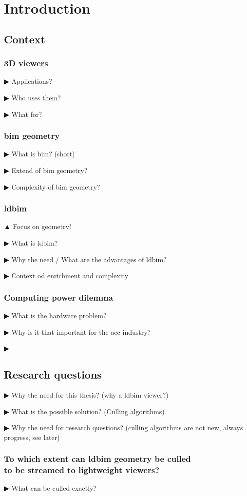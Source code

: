 \chapter{Introduction}
\section{Context}
\subsection{3D viewers}
▶ Applications?

▶ Who uses them?

▶ What for?

\subsection{\acs{bim} geometry}
▶ What is \ac{bim}? (short)

▶ Extend of \ac{bim} geometry?

▶ Complexity of \ac{bim} geometry?

\subsection{\acs{ldbim}}
▲ Focus on geometry!

▶ What is \ac{ldbim}?

▶ Why the need / What are the advantages of \ac{ldbim}?

▶ Context od enrichment and complexity

\subsection{Computing power dilemma}
▶ What is the hardware problem?

▶ Why is it that important for the \ac{aec} industry?

▶


\section{Research questions}

▶ Why the need for this thesis? (why a \ac{ldbim} viewer?)

▶ What is the possible solution? (Culling algorithms)

▶ Why the need for research questions?
(culling algorithms are not new, always progress, see later)

\subsection[Can \acs{ldbim} be culled?]{To which extent can \acs{ldbim} geometry be culled\\
    to be streamed to lightweight viewers?}
▶ What can be culled exactly?

